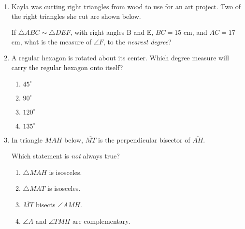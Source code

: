 \documentclass[12pt, oneside]{article}
\begin{document}
\begin{enumerate}[itemsep=2cm]
\newpage
\item Kayla was cutting right triangles from wood to use for an art project. Two of the right triangles she cut are shown below.
  \begin{center}
  \end{center}
If $\triangle ABC \sim \triangle DEF$, with right angles B and E, $BC=15$ cm, and $AC=17$ cm, what is the measure of $\angle F$, to the \emph{nearest degree}?

\item A regular hexagon is rotated about its center. Which degree measure will carry the regular hexagon onto itself? 
\begin{multicols}{2}
  \begin{enumerate}
    \item $45^\circ$
    \item $90^\circ$
    \item $120^\circ$
    \item $135^\circ$
  \end{enumerate}
\end{multicols}

\item In triangle $MAH$ below, $\overline{MT}$ is the perpendicular bisector of $\overline{AH}$.
  \begin{center}
  \end{center}
Which statement is \emph{not} always true?
  \begin{enumerate}
    \item $\triangle MAH$ is isosceles.
    \item $\triangle MAT$ is isosceles.
    \item $\overline{MT}$ bisects $\angle AMH$.
    \item $\angle A$ and $\angle TMH$ are complementary.
  \end{enumerate}


\end{enumerate}
\end{document}
